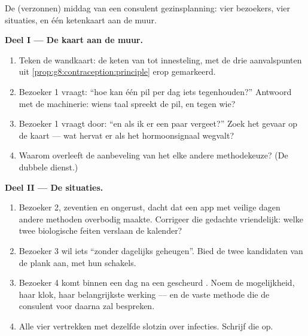 \begin{problem}\label{pb:g8:contraception:1}
De (verzonnen) middag van een consulent gezinsplanning: vier bezoekers,
vier situaties, en één ketenkaart aan de muur.

\medskip\noindent\textbf{Deel I --- De kaart aan de
muur.}
\begin{enumerate}
  \item Teken de wandkaart: de keten van  tot innesteling, met de
        drie aanvalspunten uit
        \cref{prop:g8:contraception:principle} erop gemarkeerd.
  \item Bezoeker 1 vraagt: ``hoe kan één pil per dag iets tegenhouden?''
        Antwoord met de machinerie: wiens taal spreekt de pil, en tegen
        wie?
  \item Bezoeker 1 vraagt door: ``en als ik er een paar vergeet?'' Zoek
        het gevaar op de kaart --- wat hervat er als het hormoonsignaal
        wegvalt?
  \item Waarom overleeft de aanbeveling van het  elke andere
        methodekeuze? (De dubbele dienst.)
\end{enumerate}

\medskip\noindent\textbf{Deel II --- De situaties.}
\begin{enumerate}[resume]
  \item Bezoeker 2, zeventien en ongerust, dacht dat een app met veilige
        dagen andere methoden overbodig maakte. Corrigeer die gedachte
        vriendelijk: welke twee biologische feiten verslaan de kalender?
  \item Bezoeker 3 wil iets ``zonder dagelijks geheugen''. Bied de twee
        kandidaten van de plank aan, met hun schakels.
  \item Bezoeker 4 komt binnen een dag na een gescheurd . Noem de
        mogelijkheid, haar klok, haar belangrijkste werking --- en de
        vaste methode die de consulent voor daarna zal bespreken.
  \item Alle vier vertrekken met dezelfde slotzin over infecties. Schrijf
        die op.
\end{enumerate}


\end{problem}
